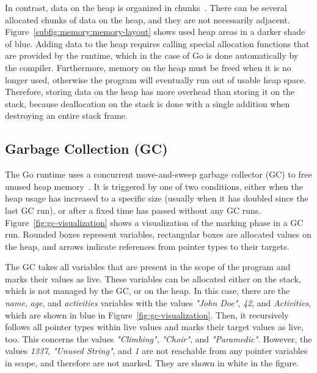 In contrast, data on the heap is organized in chunks~\cite{ferres2010}.
There can be several allocated chunks of data on the heap, and they are not necessarily adjacent.
Figure~\ref{subfig:memory:memory-layout} shows used heap areas in a darker shade of blue.
Adding data to the heap requires calling special allocation functions that are provided by the runtime, which in the
case of Go is done automatically by the compiler.
Furthermore, memory on the heap must be freed when it is no longer used, otherwise the program will eventually run out
of usable heap space.
Therefore, storing data on the heap has more overhead than storing it on the stack, because deallocation on the stack is
done with a single addition when destroying an entire stack frame.



\subsection{Garbage Collection (GC)}\label{subsec:background:memory:gc}

The Go runtime uses a concurrent move-and-sweep garbage collector (\acrshort{GC}) to free unused heap
memory~\cite{sibiryov2017}.
It is triggered by one of two conditions, either when the heap usage has increased to a specific size (usually when it
has doubled since the last \acrshort{GC} run), or after a fixed time has passed without any \acrshort{GC} runs.
Figure~\ref{fig:gc-visualization} shows a visualization of the marking phase in a \acrshort{GC} run.
Rounded boxes represent variables, rectangular boxes are allocated values on the heap, and arrows indicate references
from pointer types to their targets.



The \acrshort{GC} takes all variables that are present in the scope of the program and marks their values as live.
These variables can be allocated either on the stack, which is not managed by the \acrshort{GC}, or on the heap.
In this case, there are the \textit{name}, \textit{age}, and \textit{activities} variables with the values
\textit{"John Doe"}, \textit{42}, and \textit{Activities}, which are shown in blue in Figure~\ref{fig:gc-visualization}.
Then, it recursively follows all pointer types within live values and marks their target values as live, too.
This concerns the values \textit{"Climbing"}, \textit{"Choir"}, and \textit{"Paramedic"}.
However, the values \textit{1337}, \textit{"Unused String"}, and \textit{1} are not reachable from any pointer variables
in scope, and therefore are not marked.
They are shown in white in the figure.

